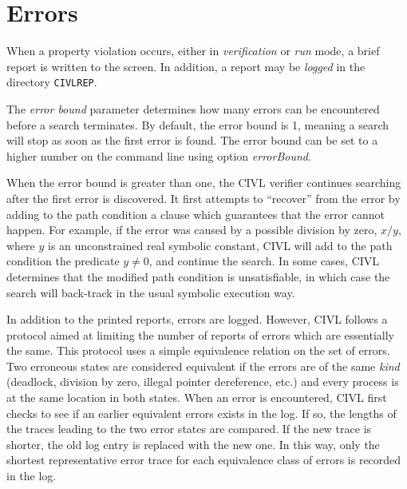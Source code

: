 \begin{optionlist}
\end{optionlist}

\section{Errors}
\label{sec:errors}

When a property violation occurs, either in \emph{verification} or
\emph{run} mode, a brief report is written to the screen.  In
addition, a report may be \emph{logged} in the directory
\texttt{CIVLREP}.

The \emph{error bound} parameter determines how many errors can be
encountered before a search terminates.  By default, the error bound
is 1, meaning a search will stop as soon as the first error is found.
The error bound can be set to a higher number on the command line
using option \emph{errorBound}.

When the error bound is greater than one, the CIVL verifier continues
searching after the first error is discovered.  It first attempts to
``recover'' from the error by adding to the path condition a clause
which guarantees that the error cannot happen.  For example, if the
error was caused by a possible division by zero, $x/y$, where $y$ is
an unconstrained real symbolic constant, CIVL will add to the path
condition the predicate $y\neq 0$, and continue the search.  In some
cases, CIVL determines that the modified path condition is
unsatisfiable, in which case the search will back-track in the usual
symbolic execution way.

In addition to the printed reports, errors are logged.  However, CIVL
follows a protocol aimed at limiting the number of reports of errors
which are essentially the same.  This protocol uses a simple
equivalence relation on the set of errors.  Two erroneous states are
considered equivalent if the errors are of the same \emph{kind}
(deadlock, division by zero, illegal pointer dereference, etc.) and
every process is at the same location in both states.  When an error
is encountered, CIVL first checks to see if an earlier equivalent
errors exists in the log.  If so, the lengths of the traces leading to
the two error states are compared.  If the new trace is shorter, the
old log entry is replaced with the new one.  In this way, only the
shortest representative error trace for each equivalence class of
errors is recorded in the log.


